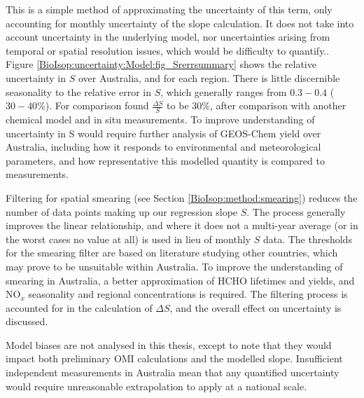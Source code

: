     This is a simple method of approximating the uncertainty of this term, only accounting for monthly uncertainty of the slope calculation.
    It does not take into account uncertainty in the underlying model, nor uncertainties arising from temporal or spatial resolution issues, which would be difficulty to quantify..
    Figure \ref{BioIsop:uncertainty:Model:fig_Srerrsummary} shows the relative uncertainty in $S$ over Australia, and for each region.
    There is little discernible seasonality to the relative error in $S$, which generally ranges from $0.3-0.4$ ($30-40\%$).
    For comparison \textcite{Palmer2006} found $\frac{\Delta S}{S}$ to be 30\%, after comparison with another chemical model and in situ measurements.
    To improve understanding of uncertainty in S would require further analysis of GEOS-Chem yield over Australia, including how it responds to environmental and meteorological parameters, and how representative this modelled quantity is compared to measurements.
    
    
    Filtering for spatial smearing (see Section \ref{BioIsop:method:smearing}) reduces the number of data points making up our regression slope $S$. 
    The process generally improves the linear relationship, and where it does not a multi-year average (or in the worst cases no value at all) is used in lieu of monthly $S$ data.
    The thresholds for the smearing filter are based on literature studying other countries, which may prove to be unsuitable within Australia.
    To improve the understanding of smearing in Australia, a better approximation of HCHO lifetimes and yields, and NO$_x$ seasonality and regional concentrations is required.
    The filtering process is accounted for in the calculation of $\Delta S$, and the overall effect on uncertainty is discussed.
    
    
    Model biases are not analysed in this thesis, except to note that they would impact both preliminary OMI calculations and the modelled slope. 
    Insufficient independent measurements in Australia mean that any quantified uncertainty would require unreasonable extrapolation to apply at a national scale.
    
